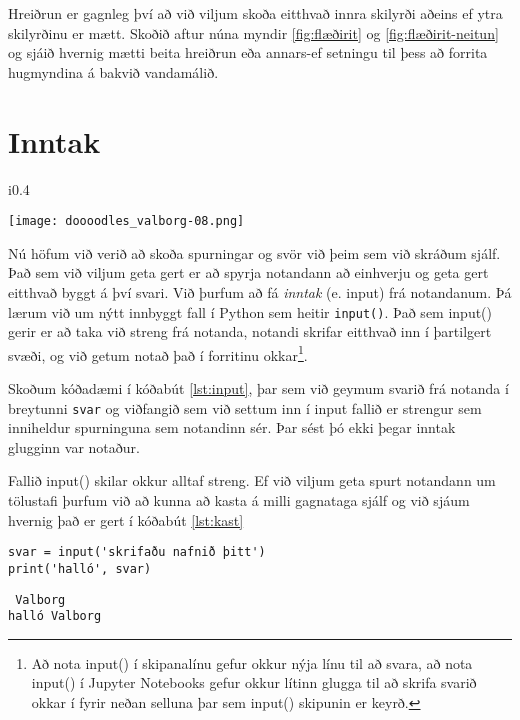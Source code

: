Hreiðrun er gagnleg því að við viljum skoða eitthvað innra skilyrði aðeins ef ytra skilyrðinu er mætt.
Skoðið aftur núna myndir \ref{fig:flæðirit} og \ref{fig:flæðirit-neitun} og sjáið hvernig mætti beita hreiðrun eða annars-ef setningu til þess að forrita hugmyndina á bakvið vandamálið.

\section{Inntak}
\begin{wrapfigure}{i}{0.4\textwidth} %
	\begin{center}
		\texttt{[image: doooodles\_valborg-08.png]}
	\end{center}
\end{wrapfigure}
Nú höfum við verið að skoða spurningar og svör við þeim sem við skráðum sjálf.
Það sem við viljum geta gert er að spyrja notandann að einhverju og geta gert eitthvað byggt á því svari.
Við þurfum að fá \emph{inntak} (e. input) frá notandanum.
Þá lærum við um nýtt innbyggt fall í Python sem heitir \texttt{input()}.
Það sem input() gerir er að taka við streng frá notanda, notandi skrifar eitthvað inn í þartilgert svæði, og við getum notað það í forritinu okkar\footnote{Að nota input() í skipanalínu gefur okkur nýja línu til að svara, að nota input() í Jupyter Notebooks gefur okkur lítinn glugga til að skrifa svarið okkar í fyrir neðan selluna þar sem input() skipunin er keyrð.}.

Skoðum kóðadæmi í kóðabút \ref{lst:input}, þar sem við geymum svarið frá notanda í breytunni \texttt{svar} og viðfangið sem við settum inn í input fallið er strengur sem inniheldur spurninguna sem notandinn sér.
Þar sést þó ekki þegar inntak glugginn var notaður.

Fallið input() skilar okkur alltaf streng.
Ef við viljum geta spurt notandann um tölustafi þurfum við að kunna að kasta á milli gagnataga sjálf og við sjáum hvernig það er gert í kóðabút \ref{lst:kast}


\begin{lstlisting}[caption=input() fallið notað, label=lst:input]
svar = input('skrifaðu nafnið þitt')
print('halló', svar)
\end{lstlisting}
\lstset{style=uttak}
\begin{lstlisting}
 Valborg
halló Valborg
\end{lstlisting}
\lstset{style=venjulegt}

